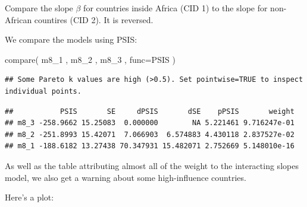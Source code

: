 \documentclass[
]{book}
\newenvironment{Shaded}{\begin{snugshade}}{\end{snugshade}}
\newcommand{\AttributeTok}[1]{\textcolor[rgb]{0.77,0.63,0.00}{#1}}
\newcommand{\FunctionTok}[1]{\textcolor[rgb]{0.00,0.00,0.00}{#1}}
\newcommand{\NormalTok}[1]{#1}
\begin{document}
Compare the slope \(\beta\) for countries inside Africa (CID 1) to the slope for non-African countires (CID 2). It is reversed.

We compare the models using PSIS:

\begin{Shaded}
\begin{Highlighting}[]
\FunctionTok{compare}\NormalTok{( m8\_1 , m8\_2 , m8\_3 , }\AttributeTok{func=}\NormalTok{PSIS )}
\end{Highlighting}
\end{Shaded}

\begin{verbatim}
## Some Pareto k values are high (>0.5). Set pointwise=TRUE to inspect individual points.
\end{verbatim}

\begin{verbatim}
##           PSIS       SE     dPSIS       dSE    pPSIS       weight
## m8_3 -258.9662 15.25083  0.000000        NA 5.221461 9.716247e-01
## m8_2 -251.8993 15.42071  7.066903  6.574883 4.430118 2.837527e-02
## m8_1 -188.6182 13.27438 70.347931 15.482071 2.752669 5.148010e-16
\end{verbatim}

As well as the table attributing almost all of the weight to the interacting slopes model, we also get a warning about some high-influence countries.

Here's a plot:
\end{document}
